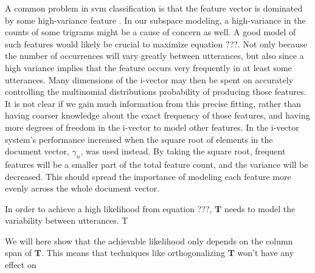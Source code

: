 A common problem in svm classification is that the feature vector is dominated by some high-variance feature \cite{wan2005speaker}. In our subspace modeling, a high-variance in the counts of some trigrams might be a cause of concern as well. A good model of such features would likely be crucial to maximize equation ???. Not only because the number of occurrences will vary greatly between utterances, but also since a high variance implies that the feature occurs very frequently in at least some utterances. Many dimensions of the i-vector may then be spent on accurately controlling the multinomial distributions probability of producing those features. It is not clear if we gain much information from this precise fitting, rather than having coarser knowledge about the exact frequency of those features, and having more degrees of freedom in the i-vector to model other features. In \cite{soufifar2011ivector} the i-vector system's performance increased when the square root of elements in the document vector, $\gamma_n$, was used instead. By taking the square root, frequent features will be a smaller part of the total feature count, and the variance will be decreased. This should spread the importance of modeling each feature more evenly across the whole document vector.



In order to achieve a high likelihood from equation ???, $\mathbf{T}$ needs to model the variability between utterances. T

We will here show that the achievable likelihood only depends on the column span of $\mathbf{T}$. This means that techniques like orthogonalizing $\mathbf{T}$ won't have any effect on 




